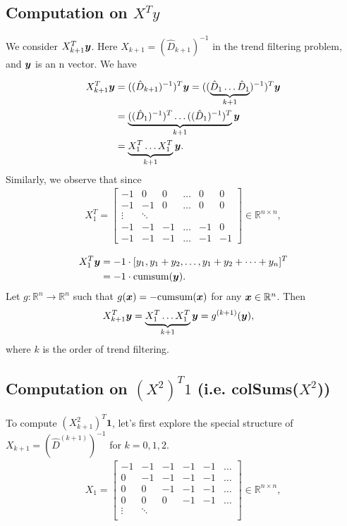 \subsection{Computation on $X^T y$} \label{Computation on Xty}
We consider $X_{k+1}^T\bm y$. Here $X_{k+1} = (\hat{D}_{k+1})^{-1}$ in the trend filtering problem, and $\bm y$ is an n vector. We have

\begin{align}
X_{k+1}^T \bm y & = ((\hat{D}_{k+1})^{-1})^T \bm y = ((\underbrace{\hat{D}_{1}\dots \hat{D}_{1}}_{k+1})^{-1})^T \bm y \\
& = \underbrace{((\hat{D}_{1})^{-1})^T \dots ((\hat{D}_{1})^{-1})^T}_{k+1} \bm y \\
& = \underbrace{X_1^T \dots X_1^T}_{k+1} \bm y.
\end{align}
Similarly, we observe that since
\begin{align}
X_1^T = \begin{bmatrix} 
    -1 & 0 & 0 & \dots & 0 & 0\\
    -1 & -1 & 0 & \dots & 0 & 0\\
    \vdots & \ddots & \\
    -1 & -1 & -1 & \dots & -1 & 0\\
    -1 & -1 & -1 & \dots & -1 & -1
    \end{bmatrix}
    \in \mathbb{R}^{n\times n},
\end{align}

\begin{align}
 X_1^T \bm y & = -1 \cdot [y_1, y_1+y_2, \dots, y_1+y_2+\dots+y_n]^T \\
& = -1 \cdot \text{cumsum}(\bm y). 
\end{align}
Let $g: \mathbb{R}^n \to \mathbb{R}^n$ such that $g(\bm x)= -\text{cumsum}(\bm x)$ for any $\bm x \in \mathbb{R}^n$. Then
\begin{align}
X_{k+1}^T \bm y & = \underbrace{X_1^T \dots X_1^T}_{k+1} \bm y = g^{(k+1)}(\bm y),
\end{align}
where $k$ is the order of trend filtering.

\subsection{Computation on $(X^2)^T 1$ (i.e. colSums($X^2$))} \label{Computation on d}

To compute $(X_{k+1}^2)^T \bm{1}$, let's first explore the special structure of $X_{k+1}=(\hat{D}^{(k+1)})^{-1}$ for $k=0,1,2$. 
\begin{align}
X_1 = \begin{bmatrix} 
    -1 & -1 & -1 & -1 & -1 & \dots \\
    0  & -1 & -1 & -1 & -1 & \dots \\
    0  & 0  & -1 & -1 & -1 & \dots \\
    0  & 0  & 0  & -1 & -1 & \dots \\
    \vdots & \ddots & \\
    \end{bmatrix}
    \in \mathbb{R}^{n\times n},
\end{align}

